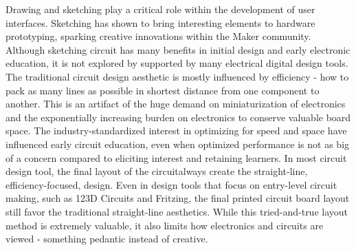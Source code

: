 \documentclass{sigchi}
\begin{document}
Drawing and sketching play a critical role within the development of user interfaces. Sketching has shown to bring interesting elements to hardware prototyping, sparking creative innovations within the Maker community. Although sketching circuit has many benefits in initial design and early electronic education, it is not explored by supported by many electrical digital design tools. The traditional circuit design aesthetic is mostly influenced by efficiency - how to pack as many lines as possible in shortest distance from one component to another. This is an artifact of the huge demand on miniaturization of electronics and the exponentially increasing burden on electronics to conserve valuable board space. The industry-standardized interest in optimizing for speed and space have influenced early circuit education, even when optimized performance is not as big of a concern compared to eliciting interest and retaining learners. In most circuit design tool, the final layout of the circuitalways create the straight-line, efficiency-focused, design. Even in design tools that focus on entry-level circuit making, such as 123D Circuits and Fritzing, the  final printed circuit board layout still favor the traditional straight-line aesthetics. While this tried-and-true layout method is extremely valuable, it also limits how electronics and circuits are viewed - something pedantic instead of creative.
\end{document}
